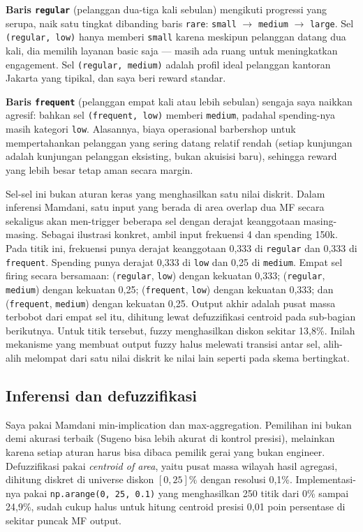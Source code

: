 \documentclass[conference]{IEEEtran}
\begin{document}
\textbf{Baris \texttt{regular}} (pelanggan dua-tiga kali sebulan)
mengikuti progressi yang serupa, naik satu tingkat dibanding baris
\texttt{rare}: \texttt{small} $\to$ \texttt{medium} $\to$
\texttt{large}. Sel \texttt{(regular, low)} hanya memberi \texttt{small}
karena meskipun pelanggan datang dua kali, dia memilih layanan basic
saja --- masih ada ruang untuk meningkatkan engagement. Sel
\texttt{(regular, medium)} adalah profil ideal pelanggan kantoran
Jakarta yang tipikal, dan saya beri reward standar.

\textbf{Baris \texttt{frequent}} (pelanggan empat kali atau lebih
sebulan) sengaja saya naikkan agresif: bahkan sel
\texttt{(frequent, low)} memberi \texttt{medium}, padahal spending-nya
masih kategori \texttt{low}. Alasannya, biaya operasional barbershop
untuk mempertahankan pelanggan yang sering datang relatif rendah
(setiap kunjungan adalah kunjungan pelanggan eksisting, bukan akuisisi
baru), sehingga reward yang lebih besar tetap aman secara margin.

Sel-sel ini bukan aturan keras yang menghasilkan satu nilai diskrit.
Dalam inferensi Mamdani, satu input yang berada di area overlap dua MF
secara sekaligus akan men-trigger beberapa sel dengan derajat
keanggotaan masing-masing. Sebagai ilustrasi konkret, ambil input
frekuensi 4 dan spending 150k. Pada titik ini, frekuensi punya derajat
keanggotaan 0,333 di \texttt{regular} dan 0,333 di \texttt{frequent}.
Spending punya derajat 0,333 di \texttt{low} dan 0,25 di \texttt{medium}.
Empat sel firing secara bersamaan: (\texttt{regular}, \texttt{low})
dengan kekuatan 0,333; (\texttt{regular}, \texttt{medium}) dengan
kekuatan 0,25; (\texttt{frequent}, \texttt{low}) dengan kekuatan 0,333;
dan (\texttt{frequent}, \texttt{medium}) dengan kekuatan 0,25. Output
akhir adalah pusat massa terbobot dari empat sel itu, dihitung lewat
defuzzifikasi centroid pada sub-bagian berikutnya. Untuk titik tersebut,
fuzzy menghasilkan diskon sekitar 13,8\%. Inilah mekanisme yang membuat
output fuzzy halus melewati transisi antar sel, alih-alih melompat dari
satu nilai diskrit ke nilai lain seperti pada skema bertingkat.

\subsection{Inferensi dan defuzzifikasi}

Saya pakai Mamdani min-implication dan max-aggregation. Pemilihan ini
bukan demi akurasi terbaik (Sugeno bisa lebih akurat di kontrol presisi),
melainkan karena setiap aturan harus bisa dibaca pemilik gerai yang
bukan engineer. Defuzzifikasi pakai \emph{centroid of area}, yaitu
pusat massa wilayah hasil agregasi, dihitung diskret di universe
diskon $[0, 25]\%$ dengan resolusi 0,1\%. Implementasi-nya pakai
\texttt{np.arange(0, 25, 0.1)} yang menghasilkan 250 titik dari 0\%
sampai 24,9\%, sudah cukup halus untuk hitung centroid presisi 0,01
poin persentase di sekitar puncak MF output.
\end{document}
